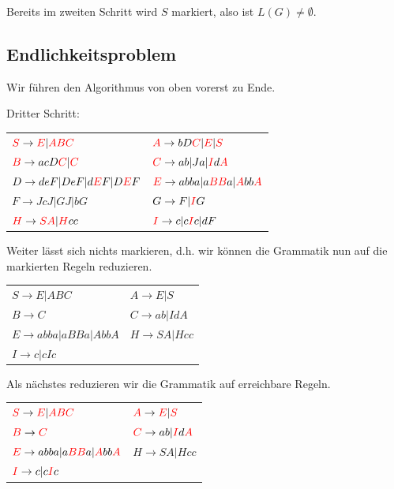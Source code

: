 \documentclass{article}
\begin{document}
Bereits im zweiten Schritt wird $S$ markiert, also ist $L(G) \neq \emptyset$.

\subsection*{Endlichkeitsproblem}
Wir führen den Algorithmus von oben vorerst zu Ende.
\begin{center}
Dritter Schritt:\\
\begin{tabular}{ll}
${\color{red}S} \rightarrow {\color{red}E} | {\color{red}ABC}$  & ${\color{red}A} \rightarrow bD{\color{red}C} | {\color{red}E} | {\color{red}S}$ \\
${\color{red}B} \rightarrow acD{\color{red}C} | {\color{red}C}$ & ${\color{red}C} \rightarrow ab | Ja | {\color{red}I}d{\color{red}A}$ \\
$D \rightarrow deF | DeF | d{\color{red}E}F | D{\color{red}E}F$ & ${\color{red}E} \rightarrow abba | a{\color{red}BB}a | {\color{red}A}bb{\color{red}A}$ \\
$F \rightarrow JcJ | GJ | bG$                                   & $G \rightarrow F | {\color{red}I}G$ \\
${\color{red}H} \rightarrow {\color{red}SA} | {\color{red}H}cc$ & ${\color{red}I} \rightarrow c | c{\color{red}I}c | dF$
\end{tabular}
\end{center}
Weiter lässt sich nichts markieren, d.h. wir können die Grammatik nun auf die markierten Regeln reduzieren.
\begin{center}
\begin{tabular}{ll}
$S \rightarrow E | ABC$            & $A \rightarrow E | S$ \\
$B \rightarrow C$                  & $C \rightarrow ab | IdA$ \\
$E \rightarrow abba | aBBa | AbbA$ & $H \rightarrow SA | Hcc$ \\
$I \rightarrow c | cIc$            & \\
\end{tabular}
\end{center}
Als nächstes reduzieren wir die Grammatik auf erreichbare Regeln.
\begin{center}
\begin{tabular}{ll}
${\color{red}S} \rightarrow {\color{red}E} | {\color{red}ABC}$                         & ${\color{red}A} \rightarrow {\color{red}E} | {\color{red}S}$ \\
${\color{red}B} \rightarrow {\color{red}C}$                                            & ${\color{red}C} \rightarrow ab | {\color{red}I}d{\color{red}A}$ \\
${\color{red}E} \rightarrow abba | a{\color{red}BB}a | {\color{red}A}bb{\color{red}A}$ & $H \rightarrow SA | Hcc$ \\
${\color{red}I} \rightarrow c | c{\color{red}I}c$                                      & \\
\end{tabular}
\end{center}
\end{document}
